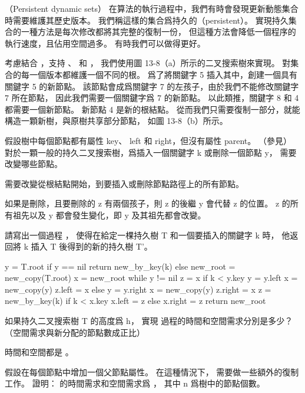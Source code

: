 \startsubject[
  title={Problems},
]

\startPROBLEM
（Persistent dynamic sets）
在算法的執行過程中，我們有時會發現更新動態集合時需要維護其歷史版本。
我們稱這樣的集合爲{\EMP 持久的（persistent）}。
實現持久集合的一種方法是每次修改都將其完整的復制一份，
但這種方法會降低一個程序的執行速度，且佔用空間過多。
有時我們可以做得更好。

考慮結合 ，支持 、  和 ，
我們使用圖 13-8（a）所示的二叉搜索樹來實現。
對集合的每一個版本都維護一個不同的根。
爲了將關鍵字 5 插入其中，創建一個具有關鍵字 5 的新節點。
該節點會成爲關鍵字 7 的左孩子，由於我們不能修改關鍵字 7 所在節點，
因此我們需要一個關鍵字爲 7 的新節點。
以此類推，關鍵字 8 和 4 都需要一個新節點。
新節點 4 是新的根結點。
從而我們只需要復制一部分，就能構造一顆新樹，與原樹共享部分節點，
如圖 13-8（b）所示。

假設樹中每個節點都有屬性 key、 left 和 right，但沒有屬性 parent。
（參見\inexercise[13.3-6]）
\startigBase[a]
\startitem%
對於一顆一般的持久二叉搜索樹，爲插入一個關鍵字 k 或刪除一個節點 y，
需要改變哪些節點。
\stopitem

\startANSWER
需要改變從根結點開始，到要插入或刪除節點路徑上的所有節點。

如果是刪除，且要刪除的 z 有兩個孩子，則 z 的後繼 y 會代替 z 的位置。
 z 的所有祖先以及 y 都會發生變化，即 y 及其祖先都會改變。
\stopANSWER

\startitem%
請寫出一個過程 ，
使得在給定一棵持久樹 T 和一個要插入的關鍵字 k 時，
他返回將 k 插入 T 後得到的新的持久樹 T'。
\stopitem

\startANSWER
{}
\startCLRS
y = T.root
if y == nil
	return new_by_key(k)
else
	new_root = new_copy(T.root)
	x = new_root
	while y != nil
		z = x
		if k < y.key
			y = y.left
			x = new_copy(y)
			z.left = x
		else
			y = y.right
			x = new_copy(y)
			z.right = x
			z = new_by_key(k)
			if k < x.key
				x.left = z
			else
				x.right = z
	return new_root
\stopCLRS
\stopANSWER

\startitem%
如果持久二叉搜索樹 T 的高度爲 h，
實現  過程的時間和空間需求分別是多少？
（空間需求與新分配的節點數成正比）
\stopitem

\startANSWER
時間和空間都是 。
\stopANSWER

\startitem%
假設在每個節點中增加一個父節點屬性。
在這種情況下，  需要做一些額外的復制工作。
證明：  的時間需求和空間需求爲 ，
其中 n 爲樹中的節點個數。
\stopitem

